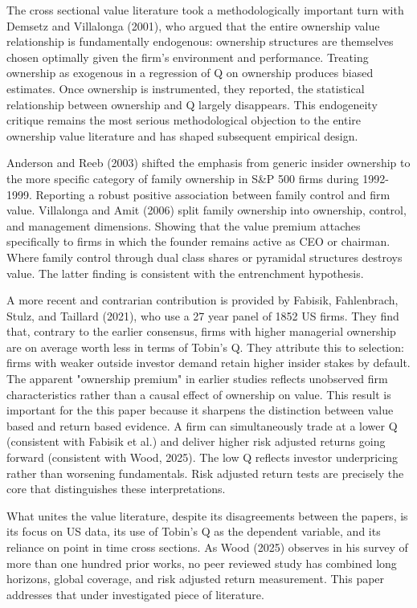 The cross sectional value literature took a methodologically important turn with Demsetz and Villalonga (2001), who argued that the entire ownership value relationship is fundamentally endogenous: ownership structures are themselves chosen optimally given the firm's environment and performance. Treating ownership as exogenous in a regression of Q on ownership produces biased estimates. Once ownership is instrumented, they reported, the statistical relationship between ownership and Q largely disappears. This endogeneity critique remains the most serious methodological objection to the entire ownership value literature and has shaped subsequent empirical design. 

Anderson and Reeb (2003) shifted the emphasis from generic insider ownership to the more specific category of family ownership in S\&P 500 firms during 1992-1999. Reporting a robust positive association between family control and firm value. Villalonga and Amit (2006) split family ownership into ownership, control, and management dimensions. Showing that the value premium attaches specifically to firms in which the founder remains active as CEO or chairman. Where family control through dual class shares or pyramidal structures destroys value. The latter finding is consistent with the entrenchment hypothesis.

A more recent and contrarian contribution is provided by Fabisik, Fahlenbrach, Stulz, and Taillard (2021), who use a 27 year panel of 1852 US firms. They find that, contrary to the earlier consensus, firms with higher managerial ownership are on average worth less in terms of Tobin's Q. They attribute this to selection: firms with weaker outside investor demand retain higher insider stakes by default. The apparent "ownership premium" in earlier studies reflects unobserved firm characteristics rather than a causal effect of ownership on value. This result is important for the this paper because it sharpens the distinction between value based and return based evidence. A firm can simultaneously trade at a lower Q (consistent with Fabisik et al.) and deliver higher risk adjusted returns going forward (consistent with Wood, 2025). The low Q reflects investor underpricing rather than worsening fundamentals. Risk adjusted return tests are precisely the core that distinguishes these interpretations.

What unites the value literature, despite its disagreements between the papers, is its focus on US data, its use of Tobin's Q as the dependent variable, and its reliance on point in time cross sections. As Wood (2025) observes in his survey of more than one hundred prior works, no peer reviewed study has combined long horizons, global coverage, and risk adjusted return measurement. This paper addresses that under investigated piece of literature.


